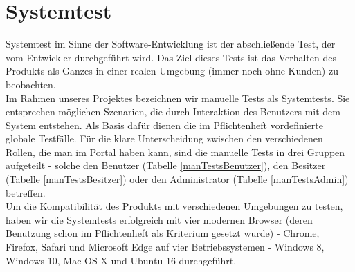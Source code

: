 \documentclass[parskip=full,11pt]{scrartcl}
\begin{document}
\newpage
\section{Systemtest} \label{systemtest}
Systemtest im Sinne der Software-Entwicklung ist der abschlie{\ss}ende Test, der vom Entwickler durchgeführt wird. Das Ziel dieses Tests ist das Verhalten des Produkts als Ganzes in einer realen Umgebung (immer noch ohne Kunden) zu beobachten.\\
Im Rahmen unseres Projektes bezeichnen wir manuelle Tests als Systemtests. Sie entsprechen möglichen Szenarien, die durch Interaktion des Benutzers mit dem System entstehen. Als Basis dafür dienen die im Pflichtenheft vordefinierte globale Testfälle. Für die klare Unterscheidung zwischen den verschiedenen Rollen, die man im Portal haben kann, sind die manuelle Tests in drei Gruppen aufgeteilt - solche den Benutzer (Tabelle \ref{manTestsBenutzer}), den Besitzer (Tabelle \ref{manTestsBesitzer}) oder den Administrator (Tabelle \ref{manTestsAdmin}) betreffen.\\
Um die Kompatibilität des Produkts mit verschiedenen Umgebungen zu testen, haben wir die Systemtests erfolgreich mit vier modernen Browser (deren Benutzung schon im Pflichtenheft als Kriterium gesetzt wurde) - Chrome, Firefox, Safari und Microsoft Edge auf vier Betriebssystemen - Windows 8, Windows 10, Mac OS X und Ubuntu 16 durchgeführt.  
\end{document}
